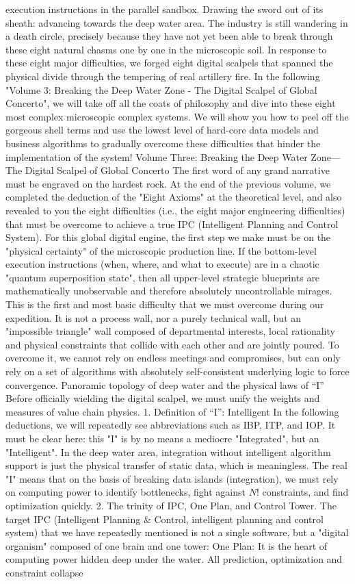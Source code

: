 \documentclass[11pt,a4paper]{article}
\begin{document}
execution instructions in the parallel sandbox. Drawing the sword out of its sheath: advancing towards the deep water area. The industry is still wandering in a death circle, precisely because they have not yet been able to break through these eight natural chasms one by one in the microscopic soil. In response to these eight major difficulties, we forged eight digital scalpels that spanned the physical divide through the tempering of real artillery fire. In the following "Volume 3: Breaking the Deep Water Zone - The Digital Scalpel of Global Concerto", we will take off all the coats of philosophy and dive into these eight most complex microscopic complex systems. We will show you how to peel off the gorgeous shell terms and use the lowest level of hard-core data models and business algorithms to gradually overcome these difficulties that hinder the implementation of the system! Volume Three: Breaking the Deep Water Zone—The Digital Scalpel of Global Concerto The first word of any grand narrative must be engraved on the hardest rock. At the end of the previous volume, we completed the deduction of the "Eight Axioms" at the theoretical level, and also revealed to you the eight difficulties (i.e., the eight major engineering difficulties) that must be overcome to achieve a true IPC (Intelligent Planning and Control System). For this global digital engine, the first step we make must be on the "physical certainty" of the microscopic production line. If the bottom-level execution instructions (when, where, and what to execute) are in a chaotic "quantum superposition state", then all upper-level strategic blueprints are mathematically unobservable and therefore absolutely uncontrollable mirages. This is the first and most basic difficulty that we must overcome during our expedition. It is not a process wall, nor a purely technical wall, but an "impossible triangle" wall composed of departmental interests, local rationality and physical constraints that collide with each other and are jointly poured. To overcome it, we cannot rely on endless meetings and compromises, but can only rely on a set of algorithms with absolutely self-consistent underlying logic to force convergence. Panoramic topology of deep water and the physical laws of “I” Before officially wielding the digital scalpel, we must unify the weights and measures of value chain physics. 1. Definition of “I”: Intelligent In the following deductions, we will repeatedly see abbreviations such as IBP, ITP, and IOP. It must be clear here: this "I" is by no means a mediocre "Integrated", but an "Intelligent". In the deep water area, integration without intelligent algorithm support is just the physical transfer of static data, which is meaningless. The real "I" means that on the basis of breaking data islands (integration), we must rely on computing power to identify bottlenecks, fight against $N!$ constraints, and find optimization quickly. 2. The trinity of IPC, One Plan, and Control Tower. The target IPC (Intelligent Planning \& Control, intelligent planning and control system) that we have repeatedly mentioned is not a single software, but a "digital organism" composed of one brain and one tower: One Plan: It is the heart of computing power hidden deep under the water. All prediction, optimization and constraint collapse 
\end{document}
